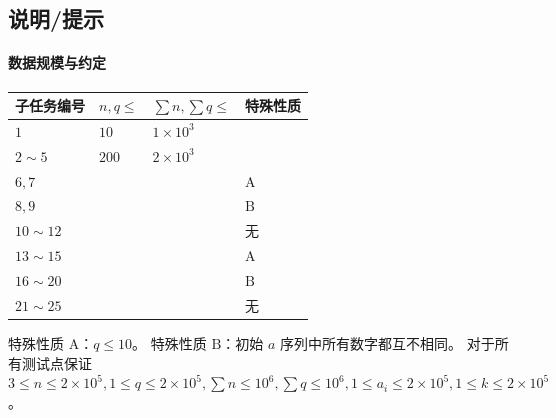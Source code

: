 \documentclass[12pt,a4paper,oneside]{ctexart}
\begin{document}
\subsection*{说明/提示}
\paragraph{数据规模与约定}
\begin{center}\small
\begin{tabularx}{\textwidth}{|>{\centering\arraybackslash}X|>{\centering\arraybackslash}X|>{\centering\arraybackslash}X|>{\centering\arraybackslash}X|}\hline
子任务编号 & $n,q \leq$ & $\sum n,\sum q \leq$ & 特殊性质\\\hline
$1$ & $10$ & $1 \times 10^{3}$ & \multirow{2}{*}{无}\\\cline{1-3}
$2\sim 5$ & $200$ & $2 \times 10^{3}$ & \\\hline
$6,7$ & \multirow{3}{*}{$2000$} & \multirow{3}{*}{$2 \times 10^{4}$} & $\text{A}$\\\cline{1-1}\cline{4-4}
$8,9$ &  &  & $\text{B}$\\\cline{1-1}\cline{4-4}
$10\sim 12$ &  &  & 无\\\hline
$13 \sim 15$ & \multirow{3}{*}{$2 \times 10^{5}$} & \multirow{3}{*}{$10^{6}$} & $\text{A}$\\\cline{1-1}\cline{4-4}
$16\sim 20$ &  &  & $\text{B}$\\\cline{1-1}\cline{4-4}
$21\sim 25$ &  &  & 无\\\hline
\end{tabularx}
\end{center}
特殊性质 $\text{A}$：$q\leq 10$。
特殊性质 $\text{B}$：初始 $a$ 序列中所有数字都互不相同。
对于所有测试点保证 $3 \leq n \leq 2 \times 10^5, 1 \leq q \leq 2 \times 10^5,\sum n \leq 10^6, \sum q \leq 10^6,1 \leq a_i \leq 2 \times 10^5,1\leq k \leq 2\times 10^5$。
\end{document}
